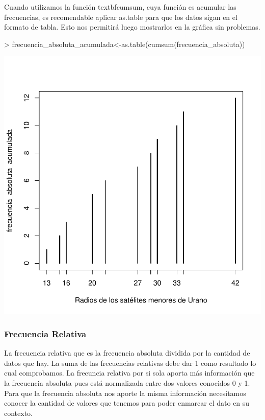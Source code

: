 \documentclass [a4paper] {article}
\begin{document}
Cuando utilizamos la función textbf{cumsum}, cuya función es acumular las frecuencias, es recomendable aplicar as.table para que los datos sigan en el formato de tabla.
Esto nos permitirá luego mostrarlos en la gráfica sin problemas.

\begin{Schunk}
\begin{Sinput}
> frecuencia_absoluta_acumulada<-as.table(cumsum(frecuencia_absoluta))
\end{Sinput}
\end{Schunk}
\begin{center}
\includegraphics{entrega-frecuencia_absoluta_acumulada_satelites_plot}
\end{center}

\newpage
\subsubsection{Frecuencia Relativa}
La frecuencia relativa que es la frecuencia absoluta dividida por la cantidad de datos que hay.
La suma de las frecuencias relativas debe dar 1 como resultado lo cual comprobamos.
La frecuncia relativa por si sola aporta más información que la frecuencia absoluta pues está normalizada entre dos valores conocidos 0 y 1.
Para que la frecuencia absoluta nos aporte la misma información necesitamos conocer la cantidad de valores que tenemos para poder enmarcar el dato en su contexto.
\end{document}
